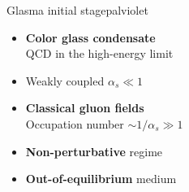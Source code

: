 \documentclass[aspectratio=169,11pt,usenames,dvipsnames]{beamer}
\begin{document}
\begin{frame}[noframenumbering]
\begin{columns}[onlytextwidth,t]
\begin{center}
\begin{custombox2}{Glasma initial stage}{palviolet}
\begin{varwidth}{0.76\textwidth}
                \begin{itemize}\itemsep0em 
                    \item {\bfseries Color glass condensate}\\[1pt]
                        {\color{lightgray}\scriptsize QCD in the high-energy limit}
                    \item Weakly coupled $\alpha_s\ll 1$
                    \item {\bfseries Classical gluon fields}\\[1pt]
                        {\color{lightgray}\scriptsize Occupation number $\sim 1/\alpha_s\gg 1$}
                    \item {\bfseries Non-perturbative} regime
                    \item {\bfseries Out-of-equilibrium} medium
                    
                \end{itemize}
                \end{varwidth}
            \end{custombox2}


\end{center}
\end{columns}
\end{frame}
\end{document}
